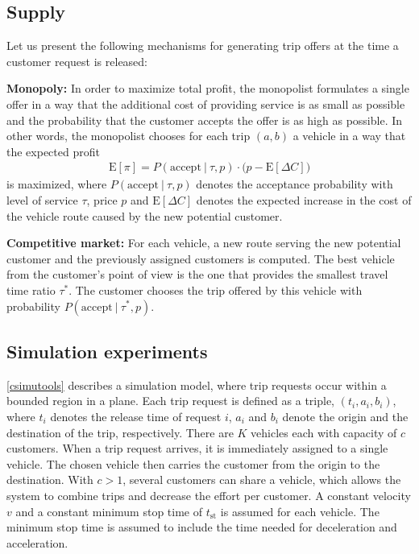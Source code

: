 \documentclass[dissertation,draft*]{aaltoseries}
\newcommand{\E}[1]{\mathrm{E}[ #1 ]}
\begin{document}
\subsection{Supply}
\label{dailydecisions}
Let us present the following mechanisms for generating trip offers at the time a customer request is released: 

\textbf{Monopoly:} In order to maximize total profit, the monopolist formulates a single offer in a way that the additional cost of 
providing service is as small as possible and the probability that the customer accepts the offer is as high as possible. In other words, 
the monopolist chooses for each trip $(a,b)$ a vehicle in a way that the expected profit
\begin{align}
\label{dailymonopoly}
\E{\pi}=P(\mbox{accept} \ | \ \tau, p) \cdot \Big( p -\E{\Delta C} \Big)
\end{align}
is maximized, where $P(\mbox{accept} \ | \ \tau, p)$ denotes the acceptance probability with level of service $\tau$, price $p$ and 
$\E{\Delta C}$ denotes the expected increase in the cost of the vehicle route caused by the new potential customer.

\textbf{Competitive market:}
For each vehicle, a new route serving the new potential customer and the previously assigned customers
is computed. The best vehicle from the customer's point of view is the one that
provides the smallest travel time ratio $\tau^*$. The customer chooses the trip offered by this vehicle with probability
$P(\mbox{accept} \ | \ \tau^*, p)$.


\subsection{Simulation experiments}
\ref{csimutools} describes a simulation model, where trip requests occur within a bounded region in a plane. Each trip request is defined as a triple, $(t_i, a_i,b_i)$, where $t_i$ denotes the release time of request $i$, $a_i$ and $b_i$ denote the origin and the destination of the trip, respectively. There are $K$ vehicles each with capacity of $c$ customers. 
When a trip request arrives, it is immediately assigned to a single vehicle. The chosen vehicle then carries the customer from the origin to the destination. With $c>1$, several customers can share a vehicle, which allows the system to combine trips and decrease the effort per customer.
A constant velocity $v$ and a constant minimum stop time of $t_{\mbox{st}}$ is assumed for each vehicle. The minimum stop time is assumed to include the time needed for deceleration and acceleration. 
\end{document}
